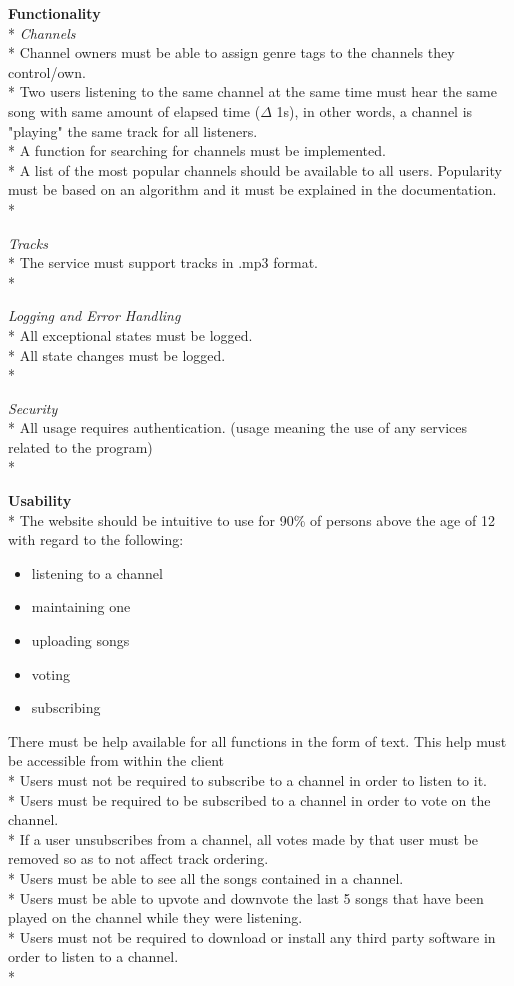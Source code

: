 \documentclass[a4paper,11pt,report]{article}
\begin{document}
\textbf{Functionality} \\*
\textit{Channels} \\*
Channel owners must be able to assign genre tags to the channels they control/own. \\*
Two users listening to the same channel at the same time must hear the same song with same amount of elapsed time (\(\Delta\) 1s), in other words, a channel is "playing" the same track for all listeners. \\*
A function for searching for channels must be implemented. \\*
A list of the most popular channels should be available to all users. Popularity must be based on an algorithm and it must be explained in the documentation. \\*

\textit{Tracks} \\*
The service must support tracks in .mp3 format. \\*

\textit{Logging and Error Handling} \\*
All exceptional states must be logged.\\*
All state changes must be logged.\\*

\textit{Security} \\*
All usage requires authentication. (usage meaning the use of any services related to the program)\\*

\textbf{Usability} \\*
The website should be intuitive to use for 90\% of persons above the age of 12 with regard to the following:
\begin{itemize}
\item listening to a channel
\item maintaining one 
\item uploading songs
\item voting
\item subscribing
\end{itemize}

There must be help available for all functions in the form of text. This help must be accessible from within the client \\*
Users must not be required to subscribe to a channel in order to listen to it. \\*
Users must be required to be subscribed to a channel in order to vote on the channel. \\*
If a user unsubscribes from a channel, all votes made by that user must be removed so as to not affect track ordering. \\*
Users must be able to see all the songs contained in a channel. \\*
Users must be able to upvote and downvote the last 5 songs that have been played on the channel while they were listening. \\*
Users must not be required to download or install any third party software in order to listen to a channel. \\*
\end{document}
